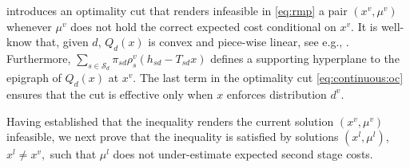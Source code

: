 \documentclass[12pt]{article}
\theoremstyle{thmstylethree}%
\newcommand{\mtc}[1] {\mathcal{#1}}
\begin{document}
 introduces an optimality cut that renders infeasible in \eqref{eq:rmp} a pair $(x^v,\mu^v)$ whenever $\mu^v$ does not hold the correct expected cost conditional on $x^v$.
It is well-know that, given $d$, $Q_d(x)$ is convex and piece-wise linear, see e.g., \cite{WalW67}. Furthermore, $\sum_{s\in\mtc{S}_d}\pi_{sd}\rho^v_s(h_{sd}-T_{sd}x)$ defines a supporting hyperplane to the epigraph of $Q_d(x)$ at $x^v$. The last term in the optimality cut \eqref{eq:continuous:oc} ensures that the cut is effective only when $x$ enforces distribution $d^v$. 

Having established that the inequality renders the current solution $(x^v,\mu^v)$ infeasible, we next prove that the inequality is satisfied by solutions $(x^l, \mu^l)$, $x^l \neq x^v,$ such that $\mu^l$ does not under-estimate expected second stage costs.
\end{document}
